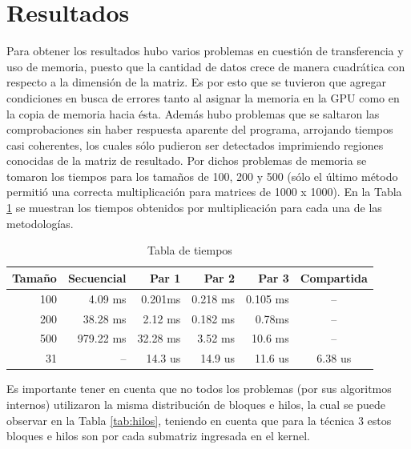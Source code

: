\documentclass{article}
\begin{document}


\newpage
\section{Resultados}
\label{sec:res}

Para obtener los resultados hubo varios problemas en cuestión de transferencia y uso de memoria, puesto que la cantidad de datos crece de manera cuadrática con respecto a la dimensión de la matriz. Es por esto que se tuvieron que agregar condiciones en busca de errores tanto al asignar la memoria en la GPU como en la copia de memoria hacia ésta. Además hubo problemas que se saltaron las comprobaciones sin haber respuesta aparente del programa, arrojando tiempos casi coherentes, los cuales sólo pudieron ser detectados imprimiendo regiones conocidas de la matriz de resultado. Por dichos problemas de memoria se tomaron los tiempos para los tamaños de 100, 200 y 500 (sólo el último método permitió una correcta multiplicación para matrices de 1000 x 1000). En la Tabla \ref{tab:tiempos} se muestran los tiempos obtenidos por multiplicación para cada una de las metodologías. 

\begin{table}[H]
\centering
	\begin{tabular}{rrrrrc}
		\hline\hline
		\textbf{Tamaño} & \textbf{Secuencial} & \textbf{Par 1} & \textbf{Par 2} & \textbf{Par 3}&\textbf{Compartida}\\
		\hline
		100 & 4.09 ms&0.201ms & 0.218 ms&0.105 ms&--\\
		200 &38.28 ms&2.12 ms &	0.182 ms	 & 0.78ms&--\\
		500	&979.22 ms&32.28 ms	&3.52 ms	&10.6 ms&--\\
		31 &--&14.3 us&14.9 us&11.6 us\footnotemark &6.38 us\\


		\hline
	\end{tabular}
	\caption{Tabla de tiempos}
	\label{tab:tiempos}
\end{table}

Es importante tener en cuenta que no todos los problemas (por sus algoritmos internos) utilizaron la misma distribución de bloques e hilos, la cual se puede observar en la Tabla \ref{tab:hilos}, teniendo en cuenta que para la técnica 3 estos bloques e hilos son por cada submatriz ingresada en el kernel. 
\end{document}
